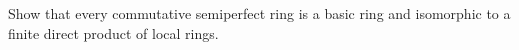 Show that every commutative semiperfect ring is a basic ring and isomorphic to a finite direct product of local rings.
